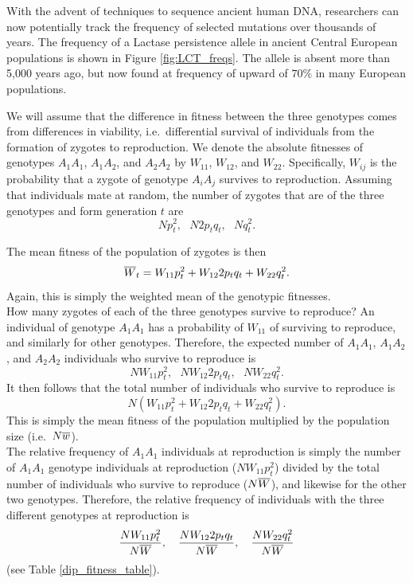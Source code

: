With the advent of techniques to sequence ancient human DNA, researchers can now potentially track the frequency of selected mutations over thousands of years. The frequency of a Lactase persistence allele in ancient Central European populations is shown in Figure \ref{fig:LCT_freqs}. The allele is absent more than 5,000 years ago, but now found at frequency of upward of $70\%$ in many European populations. 


We will assume that the difference in fitness between the three
genotypes comes from differences in viability, i.e.\ differential
survival of individuals from the formation of zygotes to reproduction.  
We denote the absolute fitnesses of genotypes $A_1A_1$, $A_1A_2$, and $A_2A_2$ by $W_{11}$, $W_{12}$, and $W_{22}$. Specifically, $W_{ij}$ is the probability that a zygote of genotype $A_iA_j$ survives to reproduction.
Assuming that individuals mate at random, the number of zygotes that are of the three genotypes and form generation $t$ are
\begin{equation}
Np_t^2, ~~~  N2p_tq_t, ~~~ Nq_t^2.
\end{equation}

The mean fitness of the population of zygotes is then
\begin{equation}
	\overline{W}_t = W_{11} p_t^2+W_{12} 2p_tq_t  +  W_{22} q_t^2.
\end{equation}
Again, this is simply the weighted mean of the genotypic fitnesses.
\\

How many zygotes of each of the three genotypes survive to reproduce? 
An individual of genotype $A_1A_1$ has a probability of $W_{11}$ of
surviving to reproduce, and similarly for other genotypes. Therefore, the expected number of $A_1A_1$, $A_1A_2$, and $A_2A_2$ individuals who survive to reproduce is
\begin{equation}
	NW_{11} p_t^2, ~~~ NW_{12} 2p_tq_t , ~~~ N W_{22} q_t^2.
\end{equation}
It then follows that the total number of individuals who survive to
reproduce is
\begin{equation}
	N \left(W_{11} p_t^2+W_{12} 2p_tq_t  +  W_{22} q_t^2 \right).
\end{equation}
This is simply the mean fitness of the population multiplied by the
population size (i.e.\ $N \overline{w}$).\\

The relative frequency of $A_1A_1$ individuals at reproduction
is simply the number of $A_1A_1$ genotype individuals at reproduction ($NW_{11} p_t^2$)
divided by the total number of individuals who survive to reproduce
($N \overline{W}$), and likewise for the other two genotypes.
Therefore, the relative frequency of individuals with the three different genotypes at reproduction is
\begin{equation}
	\frac{NW_{11} p_t^2}{N\overline{W}}, ~~~ \frac{NW_{12} 2p_tq_t}{N\overline{W}} , ~~~ \frac{N W_{22} q_t^2}{N\overline{W}}
\end{equation}
(see Table \ref{dip_fitness_table}).\\

